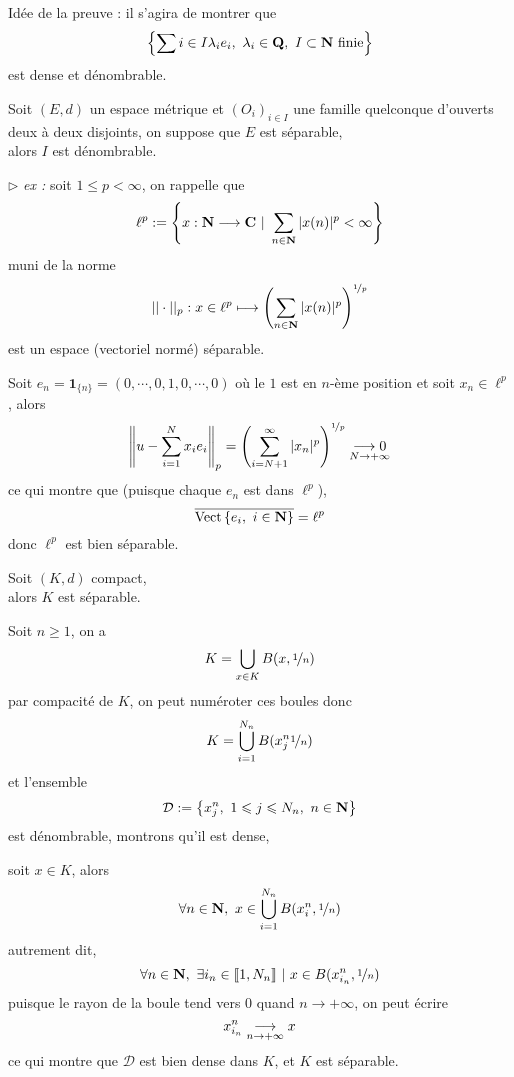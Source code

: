 \documentclass[a4paper,11pt, twoside]{article}
\begin{document}
\begin{Proof}
  Idée de la preuve : il s'agira de montrer que 
  $$\left\{\sum{i\in I}\lambda_i e_i,\ \lambda_i\in\mathbf Q,\ I\subset\N\text{ finie}\right\}$$
  est dense et dénombrable.
\end{Proof}


\begin{prop}
  Soit $(E,d)$ un espace métrique et $(O_i)_{i\in I}$ une famille quelconque d'ouverts deux à deux disjoints, on suppose que $E$ est séparable,\\

  alors $I$ est dénombrable.
\end{prop}


$\triangleright$\emph{ ex : }soit $1\leqslant p<\infty$, on rappelle que 
$$\ell^p:=\left\{x:\N\longrightarrow\C\ |\ \sum_{n\in\N}|x(n)|^p<\infty\right\}$$
muni de la norme
$$||\cdot||_p:x\in\ell^p\longmapsto\left(\sum_{n\in\mathbf N}|x(n)|^p\right)^{\nicefrac{1}{p}}$$
est un espace (vectoriel normé) séparable.


\begin{Proof}
  Soit $e_n=\mathbf 1_{\{n\}}=(0,\cdots,0,1,0,\cdots,0)$ où le $1$ est en $n$-ème position et soit $x_n\in\ell^p$, alors 
  $$\left\lVert u-\sum_{i=1}^Nx_ie_i\right\rVert_p=\left(\sum_{i=N+1}^{\infty}|x_n|^p\right)^{\nicefrac{1}{p}}\underset{N\to+\infty}{\longrightarrow 0}$$
  ce qui montre que (puisque chaque $e_n$ est dans $\ell^p$),
  $$\overline{\mathrm{Vect}\left\{e_i,\ i\in \mathbf N\right\}}=\ell^p$$
  donc $\ell^p$ est bien séparable.
\end{Proof}


\begin{lemme}
  Soit $(K,d)$ compact,\\

  alors $K$ est séparable.
\end{lemme}

\begin{Proof}
  Soit $n\geqslant 1$, on a 
  $$K=\bigcup_{x\in K}B(x,\nicefrac{1}{n})$$
  par compacité de $K$, on peut numéroter ces boules donc 
  $$K=\bigcup_{i=1}^{N_n}B(x_j^n\nicefrac{1}{n})$$
  et l'ensemble 
  $$\mathcal D:=\left\{x_j^n,\ 1\leqslant j\leqslant N_n,\ n\in\N\right\}$$
  est dénombrable, montrons qu'il est dense,

  soit $x\in K$, alors 
  $$\forall n\in\N,\ x\in\bigcup_{i=1}^{N_n}B(x_i^n, \nicefrac{1}{n})$$
  autrement dit, 
  $$\forall n\in\mathbf N,\ \exists i_n\in\llbracket 1,N_n\rrbracket\ |\ x\in B(x_{i_n}^n,\nicefrac{1}{n})$$
  puisque le rayon de la boule tend vers $0$ quand $n\to+\infty$, on peut écrire 
  $$x_{i_n}^n\underset{n\to+\infty}{\longrightarrow} x$$
  ce qui montre que $\mathcal D$ est bien dense dans $K$, et $K$ est séparable.
\end{Proof}
\end{document}
